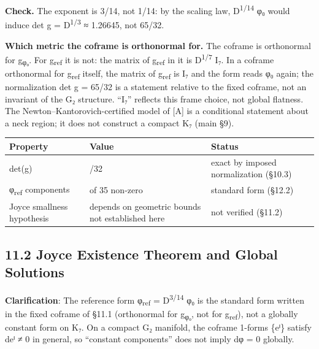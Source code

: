 \documentclass[11pt,a4paper]{article}
\begin{document}
\textbf{Check.} The exponent is 3/14, not 1/14: by the scaling law, D\textsuperscript{1/14} φ₀ would induce det g = D\textsuperscript{1/3} ≈ 1.26645, not 65/32.

\textbf{Which metric the coframe is orthonormal for.} The coframe is orthonormal for g\textsubscript{φ₀}. For g\textsubscript{ref} it is not: the matrix of g\textsubscript{ref} in it is D\textsuperscript{1/7} I₇. In a coframe orthonormal for g\textsubscript{ref} itself, the matrix of g\textsubscript{ref} is I₇ and the form reads φ₀ again; the normalization det g = 65/32 is a statement relative to the fixed coframe, not an invariant of the G₂ structure. ``I₇'' reflects this frame choice, not global flatness. The Newton--Kantorovich-certified model of {[}A{]} is a conditional statement about a neck region; it does not construct a compact K₇ (main §9).

\begin{longtable}[]{@{}
  >{\raggedright\arraybackslash}p{}
  >{\raggedright\arraybackslash}p{}
  >{\raggedright\arraybackslash}p{}@{}}
\toprule\noalign{}
\begin{minipage}[b]{\linewidth}\raggedright
Property
\end{minipage} & \begin{minipage}[b]{\linewidth}\raggedright
Value
\end{minipage} & \begin{minipage}[b]{\linewidth}\raggedright
Status
\end{minipage} \\
\midrule\noalign{}
\endhead
\bottomrule\noalign{}
\endlastfoot
det(g) & 65/32 & exact by imposed normalization (§10.3) \\
φ\textsubscript{ref} components & 7 of 35 non-zero & standard form (§12.2) \\
Joyce smallness hypothesis & depends on geometric bounds not established here & not verified (§11.2) \\
\end{longtable}

\subsection{11.2 Joyce Existence Theorem and Global Solutions}\label{joyce-existence-theorem-and-global-solutions}

\textbf{Clarification}: The reference form φ\textsubscript{ref} = D\textsuperscript{3/14} φ₀ is the standard form written in the fixed coframe of §11.1 (orthonormal for g\textsubscript{φ₀}, not for g\textsubscript{ref}), not a globally constant form on K₇. On a compact G₂ manifold, the coframe 1-forms \{eⁱ\} satisfy deⁱ ≠ 0 in general, so ``constant components'' does not imply dφ = 0 globally.
\end{document}
